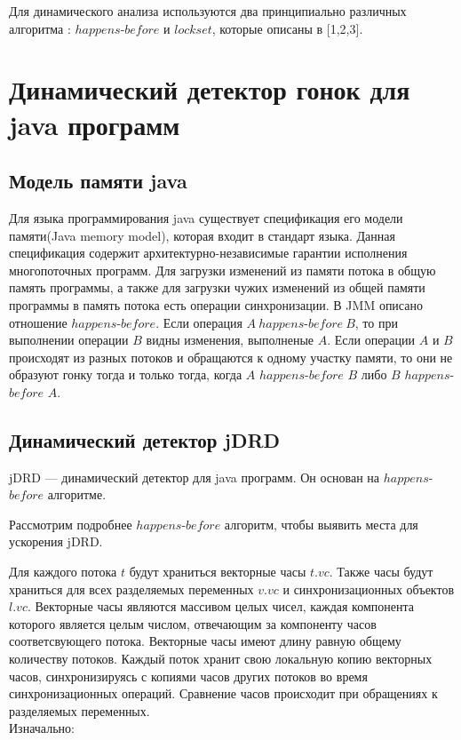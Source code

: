 Для динамического анализа используются два принципиально различных алгоритма : $happens$-$before$ и $lockset$, которые описаны в [1,2,3].


\FloatBarrier
\section{Динамический детектор гонок для java программ}

\FloatBarrier
\subsection{Модель памяти java}
Для языка программирования java существует спецификация его модели памяти(Java memory model), которая входит в стандарт языка. Данная спецификация содержит архитектурно-независимые гарантии исполнения многопоточных программ.
Для загрузки изменений из памяти потока в общую память программы, а также для загрузки чужих изменений из общей памяти программы в память потока есть операции синхронизации. В JMM описано отношение $happens$-$before$. Если операция $A\ happens$-$before\ B$, то при выполнении операции $B$ видны изменения, выполненые $A$. Если операции $A$ и $B$ происходят из разных потоков и обращаются к одному участку памяти, то они не образуют гонку тогда и только тогда, когда $A$ $happens$-$before$ $B$ либо $B$ $happens$-$before$ $A$.



\subsection{Динамический детектор jDRD}
jDRD --- динамический детектор для java программ. Он основан на $happens$-$before$ алгоритме. 

Рассмотрим подробнее $happens$-$before$ алгоритм, чтобы выявить места для ускорения jDRD.

Для каждого потока $t$ будут храниться векторные часы $t.vc$. Также часы будут храниться для всех разделяемых переменных $v.vc$ и синхронизационных объектов $l.vc$.
Векторные часы являются массивом целых чисел, каждая компонента которого является целым числом, отвечающим за компоненту часов соответсвующего потока. Векторные часы имеют длину равную общему количеству потоков. Каждый поток хранит свою локальную копию векторных часов, синхронизируясь с копиями часов других потоков во время синхронизационных операций.
Сравнение часов происходит при обращениях к разделяемых переменных.
\\Изначально:  

